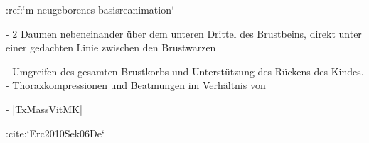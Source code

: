 :ref:`m-neugeborenes-basisreanimation`
\begin{itemize}
  -   2 Daumen nebeneinander über dem
  unteren Drittel des Brustbeins, direkt unter einer gedachten Linie zwischen den
  Brustwarzen
  
  -   Umgreifen des gesamten
  Brustkorbs und Unterstützung des Rückens des Kindes.
  -   Thoraxkompressionen und Beatmungen im Verhältnis von
  
  -   |TxMassVitMK|
\end{itemize}

:cite:`Erc2010Sek06De`\ 